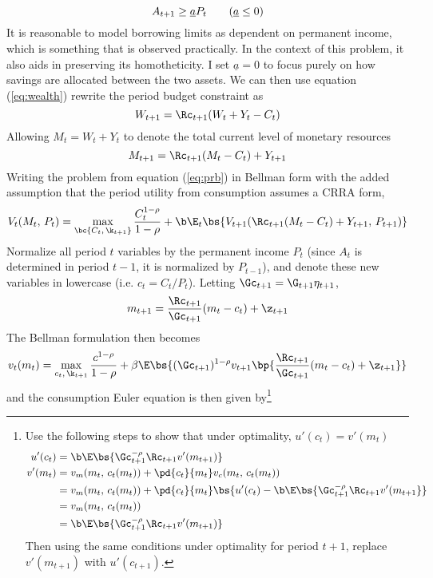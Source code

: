 \[
A_{t+1} \geq \underline{a}P_{t} \tag{$\underline{a} \leq 0$}
\]
It is reasonable to model borrowing limits as dependent on permanent income, which is something that is observed practically. In the context of this problem, it also aids in preserving its homotheticity. I set $\underline{a} = 0$ to focus purely on how savings are allocated between the two assets. We can then use equation (\ref{eq:wealth}) rewrite the period budget constraint as
\[
W_{t+1} = \Rc_{t+1}(W_{t} + Y_{t} - C_{t})
\]
Allowing $M_t = W_t + Y_t$ to denote the total current level of monetary resources
\[
M_{t+1} = \Rc_{t+1}(M_t - C_t) + Y_{t+1}
\]
Writing the problem from equation (\ref{eq:prb}) in Bellman form with the added assumption that the period utility from consumption assumes a CRRA form,
\begin{equation}
    V_t(M_t,\,P_t) = \max_{\bc{C_t,\,\k_{t+1}}}\frac{C_{t}^{1-\rho}}{1 - \rho} + \b \E_t\bs{V_{t+1}(\Rc_{t+1}(M_t - C_{t}) + Y_{t+1},\,P_{t+1})}
\end{equation}
Normalize all period $t$ variables by the permanent income $P_t$ (since $A_t$ is determined in period $t-1$, it is normalized by $P_{t-1}$), and denote these new variables in lowercase (i.e. $c_t = C_t / P_t$). Letting $\Gc_{t+1} = \G_{t+1}\eta_{t+1}$,
\begin{align*}
    m_{t+1} = \frac{\Rc_{t+1}}{\Gc_{t+1}}(m_t - c_t) + \z_{t+1}
\end{align*}
The Bellman formulation then becomes
\begin{equation}\label{eq:bellman}
    v_{t}(m_t) = \max_{c_{t},\,\k_{t+1}}\frac{c^{1-\rho}}{1-\rho} + \beta \E\bs{(\Gc_{t+1})^{1-\rho}v_{t+1}\bp{\frac{\Rc_{t+1}}{\Gc_{t+1}}(m_t - c_t) + \z_{t+1}}}
\end{equation}
and the consumption Euler equation is then given by\footnote{Use the following steps to show that under optimality, $u'(c_t) = v'(m_t)$
\begin{align*}
    u'(c_t) &= \b \E\bs{\Gc_{t+1}^{-\rho}\Rc_{t+1}v'(m_{t+1})}\\
    v'(m_t) &= v_{m}(m_t,\,c_t(m_t)) + \pd{c_t}{m_t}v_{c}(m_t,\,c_t(m_t))\\
    &= v_{m}(m_t,\,c_t(m_t)) + \pd{c_t}{m_t}\bs{u'(c_t) - \b \E\bs{\Gc_{t+1}^{-\rho}\Rc_{t+1}v'(m_{t+1}}}\\
    &= v_{m}(m_t,\,c_t(m_t))\\
    &= \b \E\bs{\Gc_{t+1}^{-\rho}\Rc_{t+1}v'(m_{t+1})}
\end{align*}
Then using the same conditions under optimality for period $t+1$, replace $v'(m_{t+1})$ with $u'(c_{t+1})$.
}
